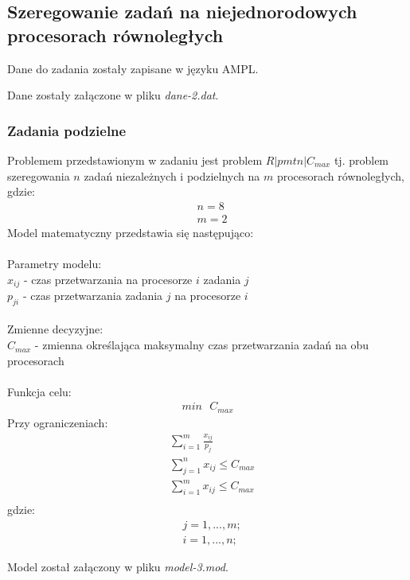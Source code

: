 \documentclass[
    12pt, %
]{../fphw}
\begin{document}
\subsection{Szeregowanie zadań na niejednorodowych procesorach równoległych}
Dane do zadania zostały zapisane w języku AMPL.

Dane zostały załączone w pliku \textit{dane-2.dat}.
\subsubsection{Zadania podzielne}
Problemem przedstawionym w zadaniu jest problem \(R|pmtn|C_{max}\)
tj. problem szeregowania \(n\) zadań niezależnych i podzielnych
na \(m\) procesorach równoległych, gdzie:
\begin{align*}
     & n = 8 \\
     & m = 2
\end{align*}
Model matematyczny przedstawia się następująco: \\ \\
Parametry modelu: \\
\(x_{ij}\) - czas przetwarzania na procesorze \(i\) zadania \(j\) \\
\(p_{ji}\) - czas przetwarzania zadania \(j\) na procesorze \(i\) \\ \\
Zmienne decyzyjne: \\
\(C_{max}\) - zmienna określająca maksymalny czas przetwarzania zadań na obu procesorach \\ \\
Funkcja celu: \\
\begin{align*}
    min \text{ } C_{max}
\end{align*}
Przy ograniczeniach: \\
\begin{align*}
     & \sum^m_{i=1} \frac{x_{ij}}{p_j}  \\
     & \sum^n_{j=1} x_{ij} \leq C_{max} \\
     & \sum^m_{i=1} x_{ij} \leq C_{max} \\
\end{align*}
gdzie:
\begin{align*}
     & j = 1, ..., m; \\
     & i = 1, ..., n;
\end{align*}

Model został załączony w pliku \textit{model-3.mod}.
\end{document}
